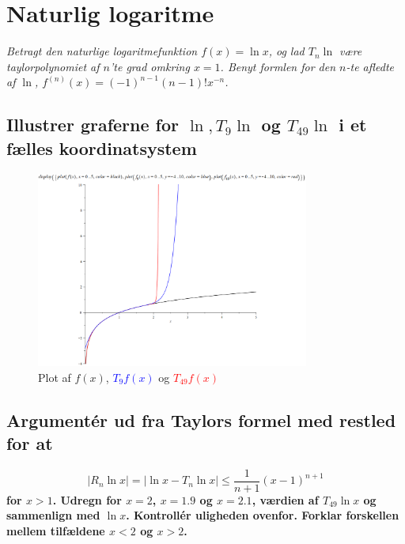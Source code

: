 \documentclass{report}
\begin{document}
\section{Naturlig logaritme}
\textit{Betragt den naturlige logaritmefunktion $f(x)=\ln{x}$, og lad $T_n\ln{}$ være taylorpolynomiet af $n$'te grad omkring $x=1$. Benyt formlen for den $n$-te afledte af $\ln{}$, $f^{(n)}(x)=(-1)^{n-1}(n-1)!x^{-n}$.}
\subsection{Illustrer graferne for $\ln{}, T_9\ln{}$ og $T_{49}\ln{}$ i et fælles koordinatsystem}
\begin{figure}[H]
    \centering
    \includegraphics[width=0.8\textwidth]{33a.png}
    \caption{Plot af $f(x)$, \textcolor{blue}{$T_9f(x)$} og \textcolor{red}{$T_{49}f(x)$}}
\end{figure}{}
\subsection{Argumentér ud fra Taylors formel med restled for at}$$|R_n\ln{x}|=|\ln{x}-T_n\ln{x}|\leq\frac{1}{n+1}(x-1)^{n+1}$$\textbf{for $x>1$. Udregn for $x=2$, $x=1.9$ og $x=2.1$, værdien af $T_{49}\ln{x}$ og sammenlign med $\ln{x}$. Kontrollér uligheden ovenfor. Forklar forskellen mellem tilfældene $x<2$ og $x>2$.}
\end{document}
